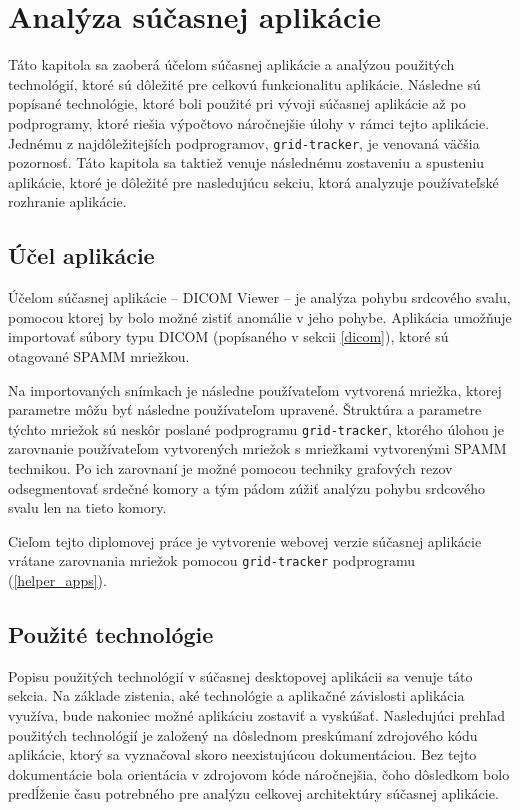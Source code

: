 \chapter {Analýza súčasnej aplikácie}
Táto kapitola sa zaoberá účelom súčasnej aplikácie a analýzou použitých technológií, ktoré sú dôležité pre celkovú funkcionalitu aplikácie. Následne sú popísané technológie, ktoré boli použité pri vývoji súčasnej aplikácie až po podprogramy, ktoré riešia výpočtovo náročnejšie úlohy v rámci tejto aplikácie. Jednému z najdôležitejších podprogramov, \texttt{grid-tracker}, je venovaná väčšia pozornosť. Táto kapitola sa taktiež venuje následnému zostaveniu a spusteniu aplikácie, ktoré je dôležité pre nasledujúcu sekciu, ktorá analyzuje používateľské rozhranie aplikácie.

\section {Účel aplikácie}
Účelom súčasnej aplikácie -- DICOM Viewer -- je analýza pohybu srdcového svalu, pomocou ktorej by bolo možné zistiť anomálie v jeho pohybe. Aplikácia umožňuje importovať súbory typu DICOM (popísaného v sekcii \ref{dicom}), ktoré sú otagované SPAMM mriežkou.

Na importovaných snímkach je následne používateľom vytvorená mriežka, ktorej parametre môžu byť následne používateľom upravené. Štruktúra a parametre týchto mriežok sú neskôr poslané podprogramu \texttt{grid-tracker}, ktorého úlohou je zarovnanie používateľom vytvorených mriežok s mriežkami vytvorenými SPAMM technikou. Po ich zarovnaní je možné pomocou techniky grafových rezov odsegmentovať srdečné komory a tým pádom zúžiť analýzu pohybu srdcového svalu len na tieto komory.

Cieľom tejto diplomovej práce je vytvorenie webovej verzie súčasnej aplikácie vrátane zarovnania mriežok pomocou \texttt{grid-tracker} podprogramu (\ref{helper_apps}).

\section {Použité technológie}
Popisu použitých technológií v súčasnej desktopovej aplikácii sa venuje táto sekcia. Na základe zistenia, aké technológie a aplikačné závislosti aplikácia využíva, bude nakoniec možné aplikáciu zostaviť a vyskúšať. Nasledujúci prehľad použitých technológií je založený na dôslednom preskúmaní zdrojového kódu aplikácie, ktorý sa vyznačoval skoro neexistujúcou dokumentáciou. Bez tejto dokumentácie bola orientácia v zdrojovom kóde náročnejšia, čoho dôsledkom bolo predĺženie času potrebného pre analýzu celkovej architektúry súčasnej aplikácie.

